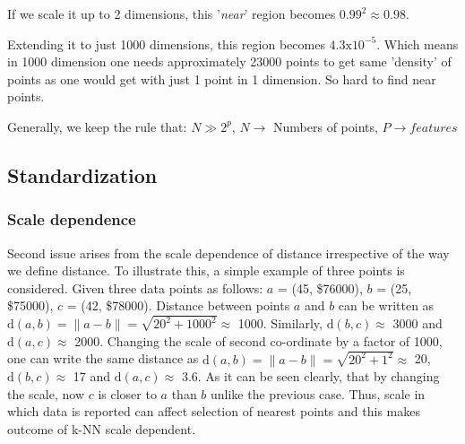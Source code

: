 \documentclass{article}
\begin{document}
{{{            If we scale it up to 2 dimensions, this '\textit{near}' region becomes \(\mathrm{0.99^2} \approx \mathrm{0.98}\). 

            Extending it to just 1000 dimensions, this region becomes \(\mathrm{4.3 x 10^{-5}}\). Which means in 1000 dimension one needs approximately 23000 points to get same 'density' of points as one would get with just 1 point in 1 dimension. So hard to find near points.

            Generally, we keep the rule that: \(N\gg 2^p\), \(N \rightarrow \) Numbers of points, \(P \rightarrow features\)
        }
    }
    \subsection{Standardization}{

    }
}


\subsubsection{Scale dependence}
Second issue arises from the scale dependence of distance irrespective of the way we define distance. To illustrate this, a simple example of three points is considered. Given three data points as follows:
$a$ = (45, \$76000), $b$ = (25, \$75000), $c$ = (42, \$78000). Distance between points $a$ and $b$ can be written as $\mathrm{d}(a, b) = \|a - b\| = \sqrt{\mathrm{20^2} + \mathrm{1000^2}} \approx$ 1000. Similarly, $\mathrm{d}(b,c) \approx$ 3000 and $\mathrm{d}(a,c) \approx$ 2000. Changing the scale of second co-ordinate by a factor of 1000, one can write the same distance as $\mathrm{d}(a, b) = \|a - b\| = \sqrt{\mathrm{20}^2 + \mathrm{1}^2} \approx$ 20, $\mathrm{d}(b,c) \approx$ 17 and $\mathrm{d}(a, c) \approx$ 3.6. As it can be seen clearly, that by changing the scale, now $c$ is closer to $a$ than $b$ unlike the previous case. Thus, scale in which data is reported can affect selection of nearest points and this makes outcome of k-NN scale dependent. 
\end{document}

